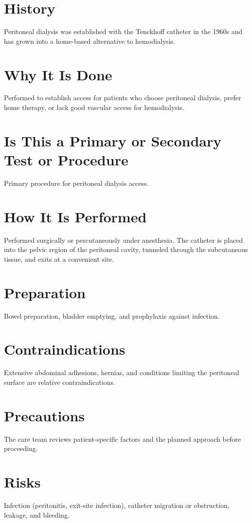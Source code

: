 \section*{History}
Peritoneal dialysis was established with the Tenckhoff catheter in the 1960s and has grown into a home-based alternative to hemodialysis.

\section*{Why It Is Done}
Performed to establish access for patients who choose peritoneal dialysis, prefer home therapy, or lack good vascular access for hemodialysis.

\section*{Is This a Primary or Secondary Test or Procedure}
Primary procedure for peritoneal dialysis access.

\section*{How It Is Performed}
Performed surgically or percutaneously under anesthesia. The catheter is placed into the pelvic region of the peritoneal cavity, tunneled through the subcutaneous tissue, and exits at a convenient site.

\section*{Preparation}
Bowel preparation, bladder emptying, and prophylaxis against infection.

\section*{Contraindications}
Extensive abdominal adhesions, hernias, and conditions limiting the peritoneal surface are relative contraindications.

\section*{Precautions}
The care team reviews patient-specific factors and the planned approach before proceeding.

\section*{Risks}
Infection (peritonitis, exit-site infection), catheter migration or obstruction, leakage, and bleeding.

